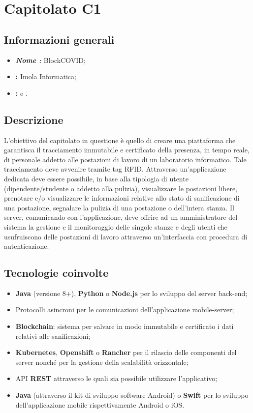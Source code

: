 \section{Capitolato C1}

\subsection{Informazioni generali}{
\begin{itemize}
\item \textbf{\emph{Nome :}} BlockCOVID;
\item \textbf{\commitProg:} Imola Informatica;
\item \textbf{\proponProg:} \VT{} e \CR.
\end{itemize}
}

\subsection{Descrizione}{
L'obiettivo del capitolato in questione è quello di creare una piattaforma che garantisca il tracciamento immutabile e certificato della presenza, in tempo reale, di personale addetto alle postazioni di lavoro di un laboratorio informatico. Tale tracciamento deve avvenire tramite tag RFID. Attraverso un'applicazione dedicata deve essere possibile, in base alla tipologia di utente (dipendente/studente o addetto alla pulizia), visualizzare le postazioni libere, prenotare e/o visualizzare le informazioni relative allo stato di sanificazione di una postazione, segnalare la pulizia di una postazione o dell'intera stanza. Il server, comunicando con l'applicazione, deve offrire ad un amministratore del sistema la gestione e il monitoraggio delle singole stanze e degli utenti che usufruiscono delle postazioni di lavoro attraverso un'interfaccia con procedura di autenticazione.

}

\subsection{Tecnologie coinvolte}{
\begin{itemize}
\item \textbf{Java} (versione 8+), \textbf{Python} o \textbf{Node.js} per lo sviluppo del server back-end;
\item Protocolli asincroni per le comunicazioni dell'applicazione mobile-server;
\item \textbf{Blockchain}: sistema per salvare in modo immutabile e certificato i dati relativi alle sanificazioni;
\item \textbf{Kubernetes}, \textbf{Openshift} o \textbf{Rancher} per il rilascio delle componenti
del server nonché per la gestione della scalabilità orizzontale;
\item API \textbf{REST} attraverso le quali sia possibile utilizzare l'applicativo;
\item \textbf{Java} (attraverso il kit di sviluppo software Android) o \textbf{Swift} per lo sviluppo dell'applicazione mobile rispettivamente Android o iOS.
\end{itemize}
}

